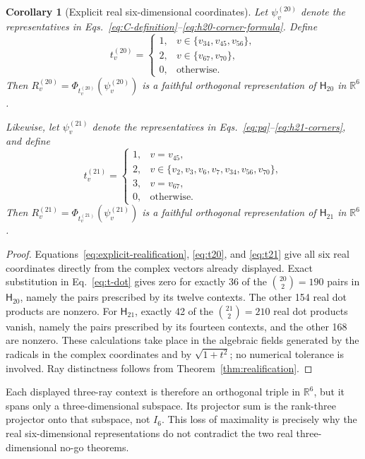 \documentclass[twocolumn,aps,pra,floatfix,amsmath,amssymb,longbibliography]{revtex4-2}
\newtheorem{corollary}[theorem]{Corollary}
\theoremstyle{definition}
\theoremstyle{remark}
\newcommand{\R}{\mathbb R}
\newcommand{\Htwenty}{\mathsf H_{20}}
\newcommand{\Htwentyone}{\mathsf H_{21}}
\begin{document}
\begin{corollary}[Explicit real six-dimensional coordinates]
\label{cor:r6}
Let $\psi_v^{(20)}$ denote the representatives in
Eqs.~\eqref{eq:C-definition}--\eqref{eq:h20-corner-formula}.  Define
\begin{equation}
 t_v^{(20)}=
 \begin{cases}
  1,&v\in\{v_{34},v_{45},v_{56}\},\\
  2,&v\in\{v_{67},v_{70}\},\\
  0,&\text{otherwise}.
 \end{cases}
 \label{eq:t20}
\end{equation}
Then $R_v^{(20)}=\Phi_{t_v^{(20)}}(\psi_v^{(20)})$ is a faithful orthogonal
representation of $\Htwenty$ in $\R^6$.

Likewise, let $\psi_v^{(21)}$ denote the representatives in
Eqs.~\eqref{eq:pq}--\eqref{eq:h21-corners}, and define
\begin{equation}
 t_v^{(21)}=
 \begin{cases}
  1,&v=v_{45},\\
  2,&v\in\{v_2,v_3,v_6,v_7,v_{34},v_{56},v_{70}\},\\
  3,&v=v_{67},\\
  0,&\text{otherwise}.
 \end{cases}
 \label{eq:t21}
\end{equation}
Then $R_v^{(21)}=\Phi_{t_v^{(21)}}(\psi_v^{(21)})$ is a faithful orthogonal
representation of $\Htwentyone$ in $\R^6$.
\end{corollary}

\begin{proof}
Equations~\eqref{eq:explicit-realification}, \eqref{eq:t20}, and
\eqref{eq:t21} give all six real coordinates directly from the complex
vectors already displayed.  Exact substitution in Eq.~\eqref{eq:t-dot}
gives zero for exactly 36 of the $\binom{20}{2}=190$ pairs in $\Htwenty$,
namely the pairs prescribed by its twelve contexts.  The other 154 real dot
products are nonzero.  For $\Htwentyone$, exactly 42 of the
$\binom{21}{2}=210$ real dot products vanish, namely the pairs prescribed by
its fourteen contexts, and the other 168 are nonzero.  These calculations
take place in the algebraic fields generated by the radicals in the complex
coordinates and by $\sqrt{1+t^2}$; no numerical tolerance is involved.
Ray distinctness follows from Theorem~\ref{thm:realification}.
\end{proof}

Each displayed three-ray context is therefore an orthogonal triple in
$\R^6$, but it spans only a three-dimensional subspace.  Its projector sum
is the rank-three projector onto that subspace, not $I_6$.  This loss of
maximality is precisely why the real six-dimensional representations do not
contradict the two real three-dimensional no-go theorems.
\end{document}
